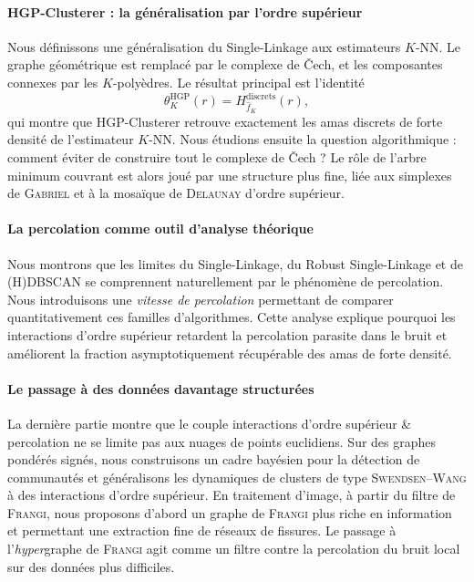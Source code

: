 \paragraph{HGP-Clusterer : la généralisation par l'ordre supérieur}
Nous définissons une généralisation du Single-Linkage aux estimateurs $K$-NN.
Le graphe géométrique est remplacé par le complexe de \v{C}ech, et les composantes connexes par les $K$-polyèdres. 
Le résultat principal est l'identité
\[
    \theta^{\mathrm{HGP}}_K(r)
    =
    H^{\mathrm{discrets}}_{\widehat f_K}(r),
\]
qui montre que HGP-Clusterer retrouve exactement les amas discrets de forte densité de l'estimateur $K$-NN. 
Nous étudions ensuite la question algorithmique : comment éviter de construire tout le complexe de \v{C}ech ? Le rôle de l'arbre minimum couvrant est alors joué par une structure plus fine, liée aux simplexes de \textsc{Gabriel} et à la mosaïque de \textsc{Delaunay} d'ordre supérieur.

\paragraph{La percolation comme outil d'analyse théorique}
Nous montrons que les limites du Single-Linkage, du Robust Single-Linkage et de (H)DBSCAN se comprennent naturellement par le phénomène de percolation.
Nous introduisons une \emph{vitesse de percolation} permettant de comparer quantitativement ces familles d'algorithmes. 
Cette analyse explique pourquoi les interactions d'ordre supérieur retardent la percolation parasite dans le bruit et améliorent la fraction asymptotiquement récupérable des amas de forte densité.

\paragraph{Le passage à des données davantage structurées}
La dernière partie montre que le couple interactions d'ordre supérieur \& percolation ne se limite pas aux nuages de points euclidiens. 
Sur des graphes pondérés signés, nous construisons un cadre bayésien pour la détection de communautés et généralisons les dynamiques de clusters de type
\textsc{Swendsen--Wang} à des interactions d'ordre supérieur. 
En traitement d'image, à partir du filtre de \textsc{Frangi}, nous proposons d'abord un graphe de \textsc{Frangi} plus riche en information et permettant une extraction fine de réseaux de fissures. Le passage à l'\emph{hyper}graphe de \textsc{Frangi} agit comme un filtre contre la percolation du bruit local sur des données plus difficiles.

